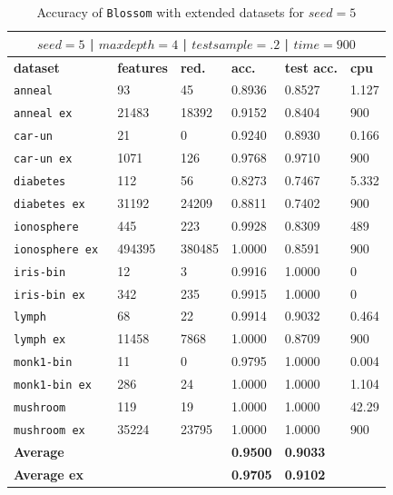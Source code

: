 \documentclass[12pt]{report}
\theoremstyle{definition}
\theoremstyle{definition}
\theoremstyle{definition}
\begin{document}
\begin{table}[ht]
    \centering
    \begin{tabular}{L{3.5cm} R{1.8cm} R{1.8cm} R{1.8cm} R{1.8cm} R{1.8cm}}
        \hline
         \\
        \hline
        \bf dataset & \bf features & \bf red. & \bf acc. & \bf test acc. & \bf cpu \\
        \hline
        \tt anneal & 93 & 45 & 0.8936 &	0.8527 & 1.127 \\
        \tt anneal ex & 21483 &	18392 &	0.9152 & 0.8404 & 900 \\
        \tt car-un & 21 & 0	& 0.9240 & 0.8930 &	0.166 \\
        \tt car-un ex & 1071 & 126 & 0.9768 & 0.9710 & 900 \\
        \tt diabetes & 112 & 56 & 0.8273 & 0.7467 & 5.332 \\
        \tt diabetes ex & 31192 & 24209 & 0.8811 & 0.7402 & 900 \\
        \tt ionosphere & 445 & 223 & 0.9928 & 0.8309 & 489 \\
        \tt ionosphere ex & 494395 & 380485	& 1.0000 & 0.8591 &	900 \\
        \tt iris-bin & 12 &	3 &	0.9916 & 1.0000	& 0 \\
        \tt iris-bin ex & 342 &	235 & 0.9915 & 1.0000 & 0 \\
        \tt lymph & 68 & 22 & 0.9914 & 0.9032 & 0.464 \\
        \tt lymph ex & 11458 & 7868	& 1.0000 & 0.8709 & 900 \\
        \tt monk1-bin & 11 & 0 & 0.9795 & 1.0000 & 0.004 \\
        \tt monk1-bin ex & 286 & 24	& 1.0000 & 1.0000 & 1.104 \\
        \tt mushroom & 119 & 19	& 1.0000 & 1.0000 &	42.29 \\
        \tt mushroom ex & 35224 & 23795 & 1.0000 & 1.0000 &	900 \\
        \hline
        \bf Average & & & \bf 0.9500 & \bf 0.9033 & \\
        \hline
        \bf Average ex & & & \bf 0.9705 & \bf 0.9102 & \\
        \hline
    \end{tabular}
    \caption{Accuracy of \texttt{Blossom} with extended datasets for $seed=5$}
    \label{fig:seed5}
\end{table}
\end{document}
